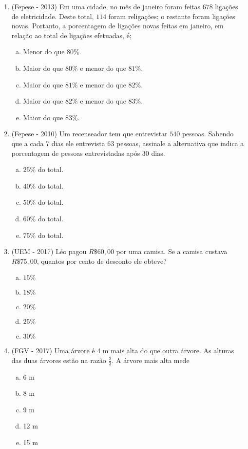 \begin{enumerate}
    \item (Fepese - 2013)  Em uma cidade, no mês de janeiro foram feitas $678$ ligações de eletricidade. Deste total, $114$ foram religações; o restante foram ligações novas. Portanto, a porcentagem de ligações novas feitas em janeiro, em relação ao total de ligações efetuadas, é;
    \begin{enumerate}[a)]
    \item Menor do que $80\%$.
    \item Maior do que $80\%$ e menor do que $81\%$.
    \item Maior do que $81\%$ e menor do que $82\%$.
    \item Maior do que $82\%$ e menor do que $83\%$.
    \item Maior do que $83\%$.
    \end{enumerate}
    
    
    \item (Fepese - 2010) Um recenseador tem que entrevistar $540$ pessoas. Sabendo que a cada $7$ dias ele entrevista $63$ pessoas, assinale a alternativa que indica a porcentagem de pessoas entrevistadas após $30$ dias.
    \begin{enumerate}[a)]
    \item $25\%$ do total.
    \item $40\%$ do total.
    \item $50\%$ do total.
    \item $60\%$ do total.
    \item $75\%$ do total.
    \end{enumerate}
    
    \item (UEM - 2017) Léo pagou $R\$ 60,00$ por uma camisa. Se a camisa custava $R\$ 75,00$, quantos por cento de desconto ele obteve?
    \begin{enumerate}[a)]
    \item $15 \%$
    \item $18 \%$
    \item $20 \%$
    \item $25 \%$
    \item $30 \%$
    \end{enumerate}
    
    \item (FGV - 2017) Uma árvore é 4 m mais alta do que outra árvore. As alturas das duas árvores estão na razão $\frac{2}{3}$. A árvore mais alta mede
    \begin{enumerate}[a)]
    \item 6 m
    \item 8 m
    \item 9 m
    \item 12 m
    \item 15 m
    \end{enumerate}
    

\end{enumerate}
